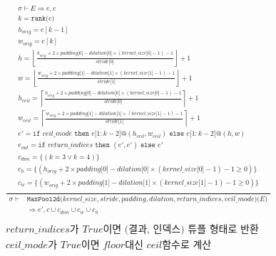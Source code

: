 \documentclass{article}
\makeatletter
\newcommand{\x}{\times}
\newcommand{\Rar}{\Rightarrow}
\newcommand{\mtt}[1]{\mathtt{#1}}
\newcommand{\op}[2]{\mtt{#1(}#2\mtt{)}}
\newcommand{\module}[3]{\mtt{#1(}#2\mtt{)(}#3\mtt{)}}
\newcommand{\conc}{\mtt{@}}
\newcommand{\ind}[1]{\mtt{[}#1\mtt{]}}
\newcommand{\indr}[2]{\mtt{[}#1\mtt{:}#2\mtt{]}}
\newcommand{\ifs}[3]{\mtt{if}\,\,#1\,\,\mtt{then}\,\,#2\,\,\mtt{else}\,\,#3}
\makeatother
\begin{document}
\begin{align*}
  \frac
  {
    \begin{array}{l}
      \sigma \vdash E \Rar e, c \\
      k = \op{rank}{e} \\
      h_{orig} = e[k-1] \\
      w_{orig} = e[k] \\
      h = \left\lfloor \frac{h_{orig} + 2 \x padding \ind{0} - dilation \ind{0}
        \x (kernel\_size \ind{0} - 1) - 1}{stride \ind{0}} \right\rfloor + 1 \\
      w = \left\lfloor \frac{w_{orig} + 2 \x padding \ind{1} - dilation \ind{1}
        \x (kernel\_size \ind{1} - 1) - 1}{stride \ind{1}} \right\rfloor + 1 \\
      h_{ceil} = \left\lceil \frac{h_{orig} + 2 \x padding \ind{0} - dilation \ind{0}
        \x (kernel\_size \ind{0} - 1) - 1}{stride \ind{0}} \right\rceil + 1 \\
      w_{ceil} = \left\lceil \frac{w_{orig} + 2 \x padding \ind{1} - dilation \ind{1}
        \x (kernel\_size \ind{1} - 1) - 1}{stride \ind{1}} \right\rceil + 1 \\
      e' = \ifs{ceil\_mode}{e\indr{1}{k-2} \conc (h_{ceil},
      w_{ceil})}{e\indr{1}{k-2} \conc (h, w)} \\
      e_{out} = \ifs{return\_indices}{(e', e')}{e'}\\
      c_{dim} = \{ (k = 3 \lor k = 4) \} \\
      c_h = \{ (h_{orig} + 2 \x padding \ind{0} - dilation \ind{0}
        \x (kernel\_size \ind{0} - 1) - 1 \geq 0) \} \\
      c_w = \{ (w_{orig} + 2 \x padding \ind{1} - dilation \ind{1}
        \x (kernel\_size \ind{1} - 1) - 1 \geq 0) \} \\
    \end{array}
  }
  {
    \begin{array}{rl}
      \sigma \vdash & \module{MaxPool2d}{kernel\_size, stride, padding,
        dilation, return\_indices, ceil\_mode}{E} \\
      & \Rar e', c \cup c_{dim} \cup c_w \cup c_h 
    \end{array}
  } \\
  \\
  \text{$return\_indices$가 $True$이면 (결과, 인덱스) 튜플 형태로 반환}\\
  \text{$ceil\_mode$가 $True$이면 $floor$대신 $ceil$함수로 계산}
\end{align*}
\end{document}
